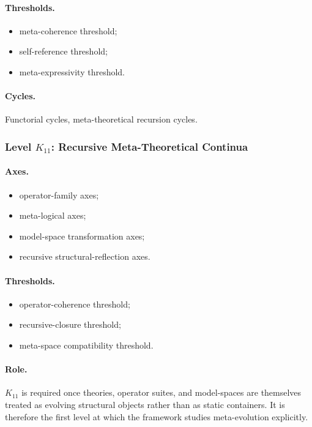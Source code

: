 \paragraph{Thresholds.}
\begin{itemize}
    \item meta-coherence threshold;
    \item self-reference threshold;
    \item meta-expressivity threshold.
\end{itemize}

\paragraph{Cycles.}
Functorial cycles, meta-theoretical recursion cycles.

\subsubsection{Level \(K_{11}\): Recursive Meta-Theoretical Continua}

\paragraph{Axes.}
\begin{itemize}
    \item operator-family axes;
    \item meta-logical axes;
    \item model-space transformation axes;
    \item recursive structural-reflection axes.
\end{itemize}

\paragraph{Thresholds.}
\begin{itemize}
    \item operator-coherence threshold;
    \item recursive-closure threshold;
    \item meta-space compatibility threshold.
\end{itemize}

\paragraph{Role.}
\(K_{11}\) is required once theories, operator suites, and model-spaces are
themselves treated as evolving structural objects rather than as static
containers. It is therefore the first level at which the framework studies
meta-evolution explicitly.

